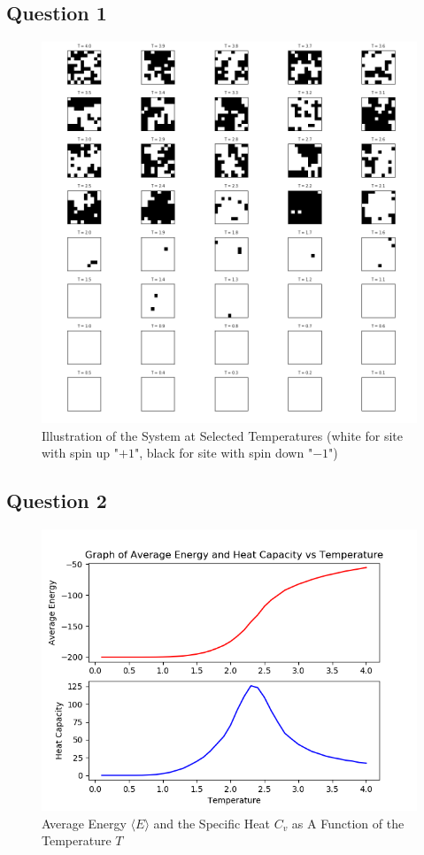 \documentclass[a4paper]{article}
\numberwithin{equation}{section}
\begin{document}
\subsection{Question 1}
\begin{figure}[H]
	\centering
	\includegraphics[scale=0.7]{illustration.png}
	\caption{Illustration of the System at Selected Temperatures (white for site with spin up "$+1$", black for site with spin down "$-1$")}
	\label{fig:illustration}
\end{figure}
\subsection{Question 2}
\begin{figure}[H]
	\centering
	\includegraphics[scale=0.7]{ecvvst.png}
	\caption{Average Energy $\langle E \rangle$ and the Specific Heat $C_v$ as A Function of the Temperature $T$}
	\label{fig:ecvvst}
\end{figure}
\end{document}
